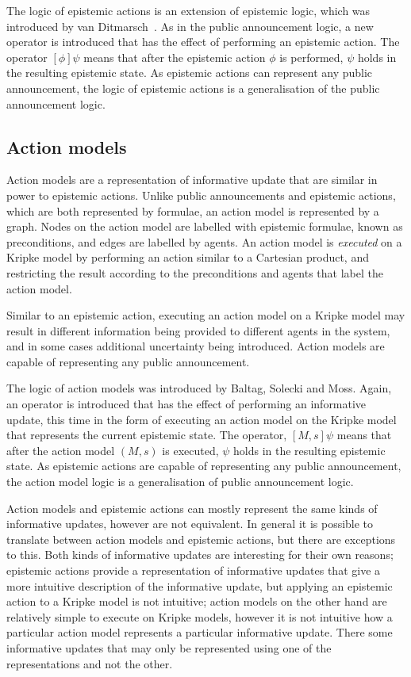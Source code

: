 The logic of epistemic actions is an extension of epistemic logic, which was
introduced by van
Ditmarsch~\cite{vanditmarsch1999logic,vanditmarsch2001knowledge,vanditmarsch2007dynamic}.
As in the public announcement logic, a new operator is introduced that has the
effect of performing an epistemic action. The operator $[\phi] \psi$ means that
after the epistemic action $\phi$ is performed, $\psi$ holds in the resulting
epistemic state. As epistemic actions can represent any public announcement, the
logic of epistemic actions is a generalisation of the public announcement logic.

\subsection*{Action models}

Action models are a representation of informative update that are similar in
power to epistemic actions. Unlike public announcements and epistemic actions,
which are both represented by formulae, an action model is represented by a
graph. Nodes on the action model are labelled with epistemic formulae, known as
preconditions, and edges are labelled by agents. An action model is {\em
executed} on a Kripke model by performing an action similar to a Cartesian
product, and restricting the result according to the preconditions and agents
that label the action model. 

Similar to an epistemic action, executing an action model on a Kripke model may
result in different information being provided to different agents in the
system, and in some cases additional uncertainty being introduced. Action models
are capable of representing any public announcement.

The logic of action models was introduced by Baltag, Solecki and
Moss\cite{baltag2004logics}. Again, an operator is introduced that has the
effect of performing an informative update, this time in the form of executing an
action model on the Kripke model that represents the current epistemic state.
The operator, $[M,s]\psi$ means that after the action model $(M, s)$ is
executed, $\psi$ holds in the resulting epistemic state. As epistemic actions
are capable of representing any public announcement, the action model logic is
a generalisation of public announcement logic.

Action models and epistemic actions can mostly represent the same kinds of
informative updates, however are not equivalent. In general it is possible to
translate between action models and epistemic actions, but there are exceptions
to this. %
Both kinds of informative updates are interesting for their own reasons;
epistemic actions provide a representation of informative updates that give a
more intuitive description of the informative update, but applying an
epistemic action to a Kripke model is not intuitive; action models on the other
hand are relatively simple to execute on Kripke models, however it is not
intuitive how a particular action model represents a particular informative
update. There some informative updates that may only be represented using one of
the representations and not the other.

